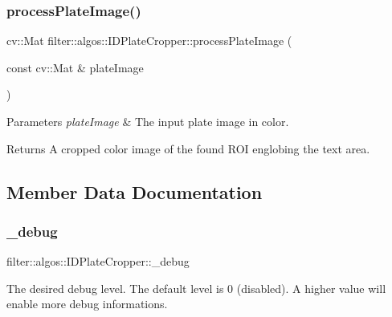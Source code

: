 \subsubsection{\texorpdfstring{process\+Plate\+Image()}{processPlateImage()}}
{\footnotesize\ttfamily cv\+::\+Mat filter\+::algos\+::\+I\+D\+Plate\+Cropper\+::process\+Plate\+Image (\begin{DoxyParamCaption}\item[{const cv\+::\+Mat \&}]{plate\+Image }\end{DoxyParamCaption})\hspace{0.3cm}{\ttfamily [private]}}


\begin{DoxyParams}{Parameters}
{\em plate\+Image} & The input plate image in color. \\
\hline
\end{DoxyParams}
\begin{DoxyReturn}{Returns}
A cropped color image of the found R\+OI englobing the text area. 
\end{DoxyReturn}


\subsection{Member Data Documentation}
\mbox{\label{classfilter_1_1algos_1_1_i_d_plate_cropper_ad57b87a49b8e57f78559a91a97523e72}} 
\subsubsection{\texorpdfstring{\+\_\+debug}{\_debug}}
{\footnotesize\ttfamily filter\+::algos\+::\+I\+D\+Plate\+Cropper\+::\+\_\+debug}

The desired debug level. The default level is 0 (disabled). A higher value will enable more debug informations. \mbox{\label{classfilter_1_1algos_1_1_i_d_plate_cropper_af30917d3c48a1911931de5801035da22}} 
